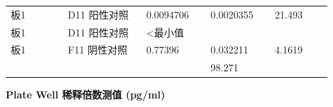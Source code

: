 \documentclass[UTF8,10pt,a4paper,fontset=fandol]{ctexart}
\newcommand{\fieldvalue}[1]{#1}
\begin{document}
\medskip
\begin{tabular}{@{}p{0.16\linewidth}p{0.22\linewidth}p{0.18\linewidth}p{0.18\linewidth}p{0.16\linewidth}@{}}
板1 & D11 阳性对照 &
\fieldvalue{0.0094706} &
\fieldvalue{0.0020355} &
\fieldvalue{21.493}
\\
板1 & D11 阳性对照 &
\fieldvalue{\textless 最小值} &
& \\
板1 & F11 阴性对照 &
\fieldvalue{0.77396} &
\fieldvalue{0.032211} &
\fieldvalue{4.1619} \\
& & &
\fieldvalue{98.271} &
\end{tabular}

\medskip
\textbf{Plate Well 稀释倍数测值 (pg/ml)}
\end{document}
